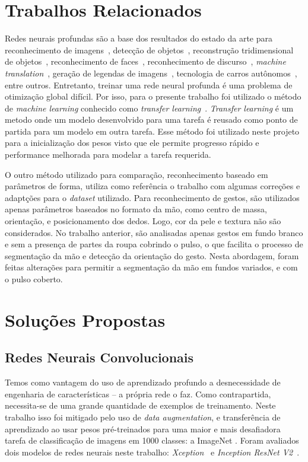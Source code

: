 \documentclass[conference]{IEEEtran}
\begin{document}
\section{Trabalhos Relacionados}
Redes neurais profundas são a base dos resultados do estado da arte para reconhecimento de imagens~\cite{simonyan}, detecção de objetos~\cite{girshick2014rich}, reconstrução tridimensional de objetos~\cite{choy20163d}, reconhecimento de faces~\cite{deepface}, reconhecimento de discurso~\cite{graves}, \textit{machine translation}~\cite{sequence}, geração de legendas de imagens~\cite{vinyals2015show}, tecnologia de carros autônomos~\cite{huval2015empirical}, entre outros. Entretanto, treinar uma rede neural profunda é uma problema de otimização global difícil. Por isso, para o presente trabalho foi utilizado o método de \textit{machine learning} conhecido como \textit{transfer learning}~\cite{Pan2010ASO}. \textit{Transfer learning} é um metodo onde um modelo desenvolvido para uma tarefa é reusado como ponto de partida para um modelo em outra tarefa. Esse método foi utilizado neste projeto para a inicialização dos pesos visto que ele permite progresso rápido e performance melhorada para modelar a tarefa requerida.
\par O outro método utilizado para comparação, reconhecimento baseado em parâmetros de forma, utiliza como referência o trabalho \cite{shapeparameters} com algumas correções e adaptções para o \textit{dataset} utilizado. Para reconhecimento de gestos, são utilizados apenas parâmetros baseados no formato da mão, como centro de massa, orientação, e posicionamento dos dedos. Logo, cor da pele e textura não são considerados. No trabalho anterior, são analisadas apenas gestos em fundo branco e sem a presença de partes da roupa cobrindo o pulso, o que facilita o processo de segmentação da mão e detecção da orientação do gesto. Nesta abordagem, foram feitas alterações para permitir a segmentação da mão em fundos variados, e com o pulso coberto.


\section{Soluções Propostas}

\subsection{Redes Neurais Convolucionais}
Temos como vantagem do uso de aprendizado profundo a desnecessidade de engenharia de características -- a própria rede o faz. Como contrapartida, necessita-se de uma grande quantidade de exemplos de treinamento. Neste trabalho isso foi mitigado pelo uso de \textit{data augmentation}, e transferência de aprendizado ao usar pesos pré-treinados para uma maior e mais desafiadora tarefa de classificação de imagens em 1000 classes: a
ImageNet \cite{imagenet_cvpr}. Foram avaliados dois modelos de redes neurais neste trabalho: \textit{Xception}~\cite{xception} e \textit{Inception ResNet V2}~\cite{szegedy2017inception}.
\end{document}
